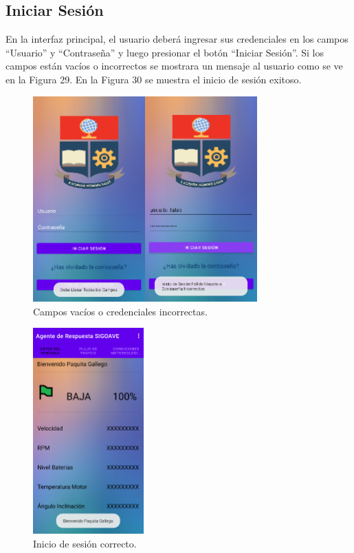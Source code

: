 \documentclass[a4paper,10pt, oneside, titlepage]{article}
\begin{document}
	\subsection{Iniciar Sesión}
	En la interfaz principal, el usuario deberá ingresar sus credenciales en los campos ``Usuario'' y ``Contraseña'' y luego presionar el botón ``Iniciar Sesión''. Si los campos están vacíos o incorrectos se mostrara un mensaje al usuario como se ve en la Figura 29. En la Figura 30 se muestra el inicio de sesión exitoso.
	\begin{figure}[!ht]
		\centering
		\includegraphics[width = .75\linewidth, height = 7.9cm]{29.png}
		\caption{Campos vacíos o credenciales incorrectas.}
	\end{figure}
	\begin{figure}[!ht]
		\centering
		\includegraphics[width = .4\linewidth, height = 7.9cm]{30.png}
		\caption{Inicio de sesión correcto.}
	\end{figure}
	
\end{document}
